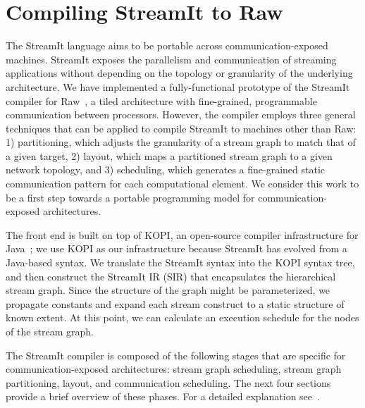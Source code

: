 \section{Compiling StreamIt to Raw}
\label{sec:phases}
The StreamIt language aims to be portable across communication-exposed
machines.  StreamIt exposes the parallelism and communication of
streaming applications without depending on the topology or
granularity of the underlying architecture.  We have implemented a
fully-functional prototype of the StreamIt compiler for
Raw~\cite{raw}, a tiled architecture with fine-grained, programmable
communication between processors.  However, the compiler employs three
general techniques that can be applied to compile StreamIt to machines
other than Raw: 1) partitioning, which adjusts the granularity of a
stream graph to match that of a given target, 2) layout, which maps a
partitioned stream graph to a given network topology, and 3)
scheduling, which generates a fine-grained static communication
pattern for each computational element.  We consider this work to be a
first step towards a portable programming model for
communication-exposed architectures.

The front end is built on top of KOPI, an open-source compiler
infrastructure for Java~\cite{kopi}; we use KOPI as our infrastructure
because StreamIt has evolved from a Java-based syntax.  We translate
the StreamIt syntax into the KOPI syntax tree, and then construct the
StreamIt IR (SIR) that encapsulates the hierarchical stream graph.
Since the structure of the graph might be parameterized, we propagate
constants and expand each stream construct to a static structure of
known extent.  At this point, we can calculate an execution schedule
for the nodes of the stream graph.

The StreamIt compiler is composed of the following stages that are
specific for communication-exposed architectures: stream graph
scheduling, stream graph partitioning, layout, and communication
scheduling.  The next four sections provide a brief overview of these
phases. For a detailed explanation see~\cite{Gordo02,Gordon-thesis,Karczma-thesis}.

